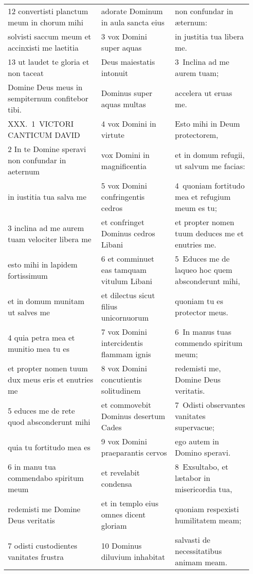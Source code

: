 \documentclass{article}
\begin{document}
\begin{longtable}{@{}p{}p{}p{}@{}}
12 convertisti planctum meum in chorum mihi	&	adorate Dominum in aula sancta eius	&	non confundar in æternum:	\\
solvisti saccum meum et accinxisti me laetitia	&	3 vox Domini super aquas	&	in justitia tua libera me.	\\
13 ut laudet te gloria et non taceat	&	Deus maiestatis intonuit	&	3 Inclina ad me aurem tuam;	\\
Domine Deus meus in sempiternum confitebor tibi.	&	Dominus super aquas multas	&	accelera ut eruas me.	\\
XXX. 1 VICTORI CANTICUM DAVID	&	4 vox Domini in virtute	&	Esto mihi in Deum protectorem,	\\
2 In te Domine speravi non confundar in aeternum	&	vox Domini in magnificentia	&	et in domum refugii, ut salvum me facias:	\\
in iustitia tua salva me	&	5 vox Domini confringentis cedros	&	4 quoniam fortitudo mea et refugium meum es tu;	\\
3 inclina ad me aurem tuam velociter libera me	&	et confringet Dominus cedros Libani	&	et propter nomen tuum deduces me et enutries me.	\\
esto mihi in lapidem fortissimum	&	6 et comminuet eas tamquam vitulum Libani	&	5 Educes me de laqueo hoc quem absconderunt mihi,	\\
et in domum munitam ut salves me	&	et dilectus sicut filius unicornuorum	&	quoniam tu es protector meus.	\\
4 quia petra mea et munitio mea tu es	&	7 vox Domini intercidentis flammam ignis	&	6 In manus tuas commendo spiritum meum;	\\
et propter nomen tuum dux meus eris et enutries me	&	8 vox Domini concutientis solitudinem	&	redemisti me, Domine Deus veritatis.	\\
5 educes me de rete quod absconderunt mihi	&	et commovebit Dominus desertum Cades	&	7 Odisti observantes vanitates supervacue;	\\
quia tu fortitudo mea es	&	9 vox Domini praeparantis cervos	&	ego autem in Domino speravi.	\\
6 in manu tua commendabo spiritum meum	&	et revelabit condensa	&	8 Exsultabo, et lætabor in misericordia tua,	\\
redemisti me Domine Deus veritatis	&	et in templo eius omnes dicent gloriam	&	quoniam respexisti humilitatem meam;	\\
7 odisti custodientes vanitates frustra	&	10 Dominus diluvium inhabitat	&	salvasti de necessitatibus animam meam.	\\

\end{longtable}
\end{document}
